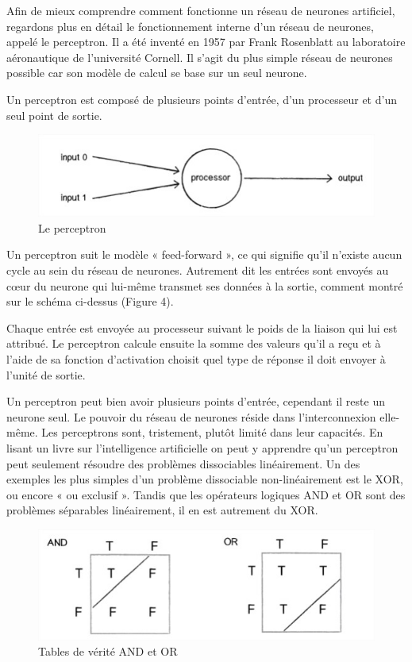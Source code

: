 \documentclass[a4paper, 12pt]{article} %
\begin{document}
Afin de mieux comprendre comment fonctionne un réseau de neurones artificiel, regardons plus en détail le fonctionnement interne d’un réseau de neurones, appelé le perceptron. Il a été inventé en 1957 par Frank Rosenblatt au laboratoire aéronautique de l’université Cornell. Il s’agit du plus simple réseau de neurones possible car son modèle de calcul se base sur un seul neurone.

Un perceptron est composé de plusieurs points d’entrée, d’un processeur et d’un seul point de sortie.

\begin{figure}[!h]%
	\begin{center} 
		\includegraphics[width=0.60\columnwidth]{images/perceptron.jpg}%
		\caption{Le perceptron}%
	\end{center}
\end{figure}

Un perceptron suit le modèle « feed-forward », ce qui signifie qu’il n’existe aucun cycle au sein du réseau de neurones. Autrement dit les entrées sont envoyés au cœur du neurone qui lui-même transmet ses données à la sortie, comment montré sur le schéma ci-dessus (Figure 4).

Chaque entrée est envoyée au processeur suivant le poids de la liaison qui lui est attribué. Le perceptron calcule ensuite la somme des valeurs qu’il a reçu et à l’aide de sa fonction d’activation choisit quel type de réponse il doit envoyer à l’unité de sortie.

Un perceptron peut bien avoir plusieurs points d’entrée, cependant il reste un neurone seul. Le pouvoir du réseau de neurones réside dans l’interconnexion elle-même. Les perceptrons sont, tristement, plutôt limité dans leur capacités. En lisant un livre sur l’intelligence artificielle on peut y apprendre qu’un perceptron peut seulement résoudre des problèmes dissociables linéairement. Un des exemples les plus simples d’un problème dissociable non-linéairement est le XOR, ou encore « ou exclusif ». Tandis que les opérateurs logiques AND et OR sont des problèmes séparables linéairement, il en est autrement du XOR.

\begin{figure}[!h]%
	\begin{center} 
		\includegraphics[width=0.60\columnwidth]{images/andor.jpg}%
		\caption{Tables de vérité AND et OR}%
	\end{center}
\end{figure}
\end{document}
